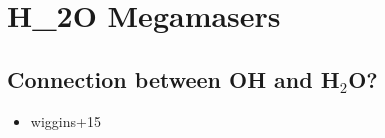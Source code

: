 \section{H_2O Megamasers}
\label{sec:h2o_mm}

\subsection{Connection between OH and H$_2$O?}
\label{sec:oh_and_h2o}

\begin{itemize}
\item wiggins+15
\end{itemize}